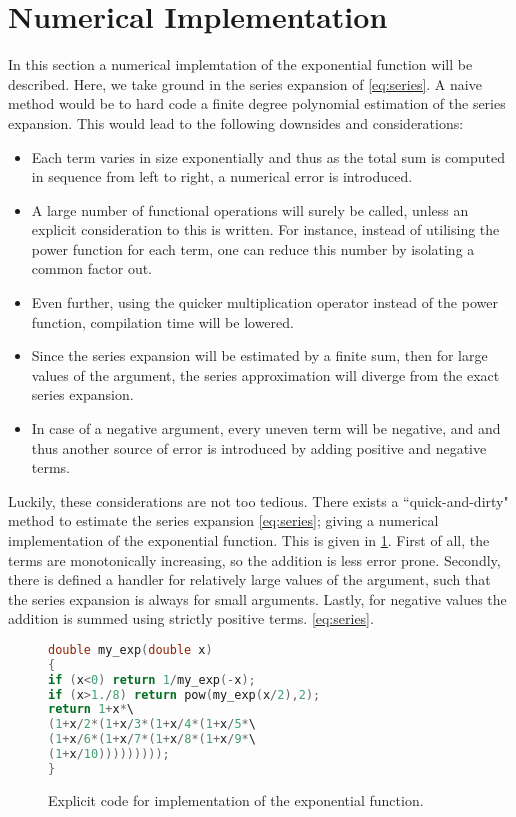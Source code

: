 \documentclass[a4paper, twocolumn, 11pt, oneside]{memoir}
\begin{document}
\section{Numerical Implementation}
In this section a numerical implemtation of the exponential function will be
described. Here, we take ground in the series expansion of \cref{eq:series}.
A naive method would be to hard code a finite degree polynomial estimation of
the series expansion. This would lead to the following downsides and
considerations:
\begin{itemize}
  \item Each term varies in size exponentially and thus as the total sum is
    computed in sequence from left to right, a numerical error is introduced.
  \item A large number of functional operations will surely be called, unless
    an explicit consideration to this is written.
    For instance, instead of utilising the power function for
    each term, one can reduce this number by isolating a common factor out.
  \item Even further, using the quicker multiplication operator instead of the
    power function, compilation time will be lowered.
  \item Since the series expansion will be estimated by a finite sum, then for
    large values of the argument, the series approximation will diverge from
    the exact series expansion.
  \item In case of a negative argument, every uneven term will be negative, and
    and thus another source of error is introduced by adding positive and
    negative terms.

\end{itemize}
Luckily, these considerations are not too tedious. There exists a
``quick-and-dirty" method to estimate the series expansion \cref{eq:series};
giving a numerical implementation of the exponential function. This is given in
\cref{fig:code}. First of all, the terms are monotonically increasing, so the addition
is less error prone. Secondly, there is defined a handler for relatively large
values of the argument, such that the series expansion is always for small
arguments. Lastly, for negative values the addition is summed using strictly
positive terms.
\cref{eq:series}.
\begin{figure}[ht]
\begin{lstlisting}[language=c]
double my_exp(double x)
{
if (x<0) return 1/my_exp(-x);
if (x>1./8) return pow(my_exp(x/2),2);
return 1+x*\
(1+x/2*(1+x/3*(1+x/4*(1+x/5*\
(1+x/6*(1+x/7*(1+x/8*(1+x/9*\
(1+x/10)))))))));
}
\end{lstlisting}
\caption{Explicit code for implementation of the exponential function.}
\label{fig:code}
\end{figure}
\end{document}
